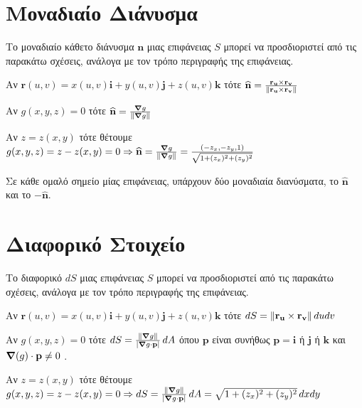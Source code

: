 \section*{Μοναδιαίο Διάνυσμα}

\begin{dfn}
  Το μοναδιαίο κάθετο διάνυσμα $ \mathbf{n} $ μιας επιφάνειας $ S $ μπορεί να 
  προσδιοριστεί από τις παρακάτω σχέσεις, ανάλογα με τον τρόπο περιγραφής της επιφάνειας.
  \begin{myitemize}
    \item Αν $ \mathbf{r}(u,v) = x(u,v)\mathbf{i}+y(u,v)\mathbf{j}+z(u,v)\mathbf{k} $ 
      τότε $ \mathbf{\widehat{n}} = \frac{\mathbf{r_{u}} \times
      \mathbf{r_{v}}}{\norm{\mathbf{r_{u}} \times \mathbf{r_{v}}}} $ 
    \item Αν $ g(x,y,z)=0 $ τότε $ \mathbf{\widehat{n}} = 
      \frac{\grad g}{\norm{\grad g}} $
    \item Αν $ z=z(x,y) $ τότε θέτουμε $ g(x,y,z)=z-z(x,y)=0 \Rightarrow 
      \mathbf{\widehat{n}} = \frac{\grad g}{\norm{\grad g}} = 
      \frac{(-z_{x},-z_{y},1)}{\sqrt{1+(z_{x})^{2}+(z_{y})^{2}}} $ 
  \end{myitemize}
\end{dfn}

\begin{rem}
  Σε κάθε ομαλό σημείο μίας επιφάνειας, υπάρχουν δύο μοναδιαία διανύσματα, το $
  \mathbf{\widehat{n}} $ και το $ -\mathbf{\widehat{n}} $.  
\end{rem}


\section*{Διαφορικό Στοιχείο}
 
\begin{dfn}
  Το διαφορικό $ dS $ μιας επιφάνειας $S$ μπορεί να προσδιοριστεί από τις παρακάτω 
  σχέσεις, ανάλογα με τον τρόπο περιγραφής της επιφάνειας.
  \begin{myitemize}
    \item Αν $ \mathbf{r}(u,v) = x(u,v)\mathbf{i}+y(u,v)\mathbf{j}+z(u,v)\mathbf{k} $ 
      τότε $ dS = \norm{\mathbf{r_{u}} \times \mathbf{r_{v}}} \, du dv $ 
    \item Αν $ g(x,y,z)=0 $ τότε $dS = \frac{\norm{\grad g}}{\abs{\grad g \cdot 
      \mathbf{p}}}\, dA $ όπου $ \mathbf{p} $ είναι συνήθως $ \mathbf{p} = \mathbf{i} $ 
      ή $ \mathbf{j} $ ή $ \mathbf{k} $ και $ \grad(g)\cdot \mathbf{p} \neq 0 $ .  
    \item Αν $ z=z(x,y) $ τότε θέτουμε $ g(x,y,z)=z-z(x,y)=0 \Rightarrow dS =
      \frac{\norm{\grad g}}{\abs{\grad g \cdot \mathbf{p}}}\, dA = 
      \sqrt{1+(z_{x})^{2}+(z_{y})^{2}} \,dxdy $ 
  \end{myitemize}
\end{dfn}


